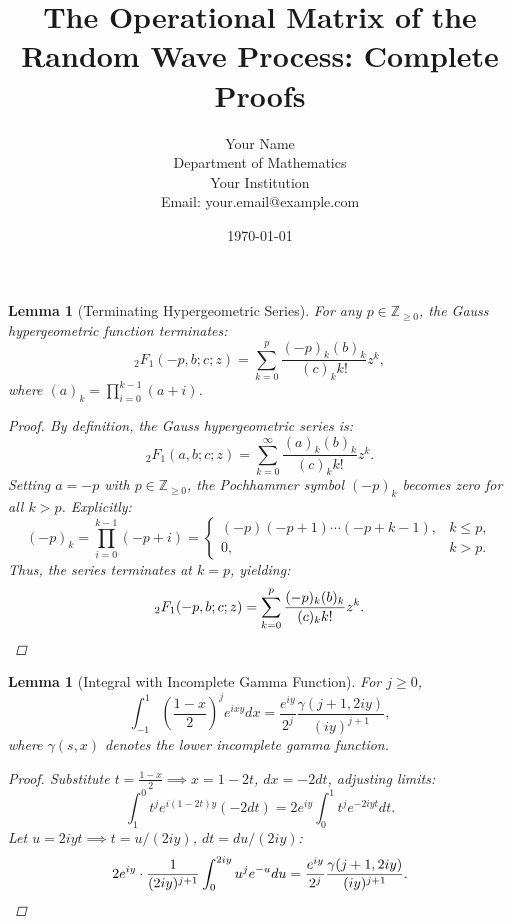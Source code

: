 \documentclass[12pt]{article}
\title{The Operational Matrix of the Random Wave Process: Complete Proofs}
\author{Your Name \\ Department of Mathematics \\ Your Institution \\ Email: your.email@example.com}
\date{\today}
\newtheorem{lemma}[theorem]{Lemma}
\begin{document}
\maketitle


\begin{lemma}[Terminating Hypergeometric Series]\label{lem:HyperExpansions}
For any \( p \in \mathbb{Z}_{\geq 0} \), the Gauss hypergeometric function terminates:
\[
{}_2F_1(-p, b; c; z) = \sum_{k=0}^p \frac{(-p)_k (b)_k}{(c)_k k!} z^k,
\]
where \((a)_k = \prod_{i=0}^{k-1}(a+i)\).

\begin{proof}
By definition, the Gauss hypergeometric series is:
\[
{}_2F_1(a, b; c; z) = \sum_{k=0}^\infty \frac{(a)_k (b)_k}{(c)_k k!} z^k.
\]
Setting \( a = -p \) with \( p \in \mathbb{Z}_{\geq 0} \), the Pochhammer symbol \( (-p)_k \) becomes zero for all \( k > p \). Explicitly:
\[
(-p)_k = \prod_{i=0}^{k-1} (-p + i) = 
\begin{cases}
(-p)(-p+1)\cdots(-p + k -1), & k \leq p, \\
0, & k > p.
\end{cases}
\]
Thus, the series terminates at \( k = p \), yielding:
\[
{}_2F_1(-p, b; c; z) = \sum_{k=0}^p \frac{(-p)_k (b)_k}{(c)_k k!} z^k.\qedhere
\]
\end{proof}
\end{lemma}


\begin{lemma}[Integral with Incomplete Gamma Function]\label{lem:IntegralGamma}
For \( j \geq 0 \),
\[
\int_{-1}^1 \left(\frac{1-x}{2}\right)^j e^{ixy}dx = \frac{e^{iy}}{2^j}\frac{\gamma(j+1,2iy)}{(iy)^{j+1}},
\]
where \(\gamma(s, x)\) denotes the lower incomplete gamma function.

\begin{proof}
Substitute \( t = \frac{1 - x}{2} \implies x = 1 - 2t \), \( dx = -2dt \), adjusting limits:
\[
\int_{1}^{0} t^j e^{i(1 - 2t)y} (-2dt) = 2e^{iy} \int_{0}^{1} t^j e^{-2iyt} dt.
\]
Let \( u = 2iyt \implies t = u/(2iy) \), \( dt = du/(2iy) \):
\[
2e^{iy} \cdot \frac{1}{(2iy)^{j+1}} \int_{0}^{2iy} u^j e^{-u} du = \frac{e^{iy}}{2^j}\frac{\gamma(j+1,2iy)}{(iy)^{j+1}}. \qedhere
\]
\end{proof}
\end{lemma}
\end{document}
